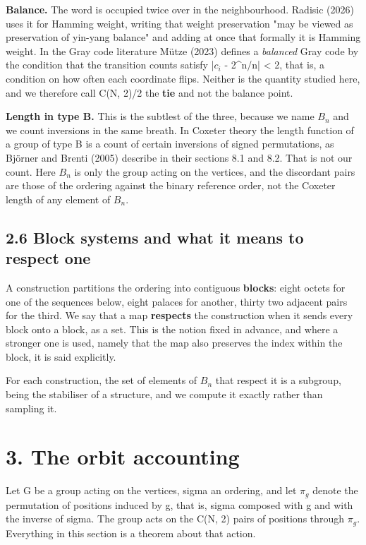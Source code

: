 \documentclass[11pt,a4paper]{article}
\begin{document}
\textbf{Balance.} The word is occupied twice over in the neighbourhood. Radisic (2026) uses it for Hamming weight, writing that weight preservation "may be viewed as preservation of yin-yang balance" and adding at once that formally it is Hamming weight. In the Gray code literature Mütze (2023) defines a \emph{balanced} Gray code by the condition that the transition counts satisfy |$c_i$ - 2\textasciicircum{}n/n| < 2, that is, a condition on how often each coordinate flips. Neither is the quantity studied here, and we therefore call C(N, 2)/2 the \textbf{tie} and not the balance point.

\textbf{Length in type B.} This is the subtlest of the three, because we name $B_n$ and we count inversions in the same breath. In Coxeter theory the length function of a group of type B is a count of certain inversions of signed permutations, as Björner and Brenti (2005) describe in their sections 8.1 and 8.2. That is not our count. Here $B_n$ is only the group acting on the vertices, and the discordant pairs are those of the ordering against the binary reference order, not the Coxeter length of any element of $B_n$.

\subsection*{2.6 Block systems and what it means to respect one}

A construction partitions the ordering into contiguous \textbf{blocks}: eight octets for one of the sequences below, eight palaces for another, thirty two adjacent pairs for the third. We say that a map \textbf{respects} the construction when it sends every block onto a block, as a set. This is the notion fixed in advance, and where a stronger one is used, namely that the map also preserves the index within the block, it is said explicitly.

For each construction, the set of elements of $B_n$ that respect it is a subgroup, being the stabiliser of a structure, and we compute it exactly rather than sampling it.

\section*{3. The orbit accounting}

Let G be a group acting on the vertices, sigma an ordering, and let $\pi_g$ denote the permutation of positions induced by g, that is, sigma composed with g and with the inverse of sigma. The group acts on the C(N, 2) pairs of positions through $\pi_g$. Everything in this section is a theorem about that action.
\end{document}
